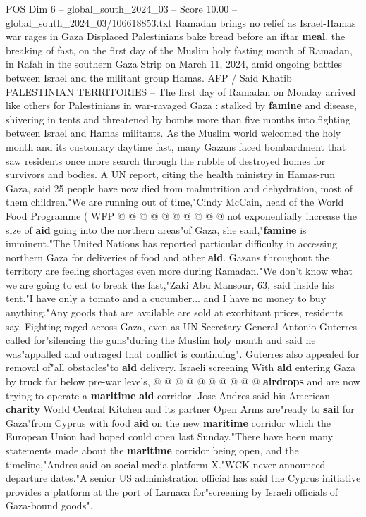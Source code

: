 \begin{textsample}{POS Dim 6 – global\_south\_2024\_03 – Score 10.00 – global\_south\_2024\_03/106618853.txt}  \label{ex:f6_pos_040}
Ramadan brings no relief as Israel-Hamas war rages in Gaza Displaced Palestinians bake bread before an iftar \textbf{meal}, the breaking of fast, on the first day of the Muslim holy fasting month of Ramadan, in Rafah in the southern Gaza Strip on March 11, 2024, amid ongoing battles between Israel and the militant group Hamas.
AFP / Said Khatib PALESTINIAN TERRITORIES -- The first day of Ramadan on Monday arrived like others for Palestinians in war-ravaged Gaza : stalked by \textbf{famine} and disease, shivering in tents and threatened by bombs more than five months into fighting between Israel and Hamas militants.
As the Muslim world welcomed the holy month and its customary daytime fast, many Gazans faced bombardment that saw residents once more search through the rubble of destroyed homes for survivors and bodies.
A UN report, citing the health ministry in Hamas-run Gaza, said 25 people have now died from malnutrition and dehydration, most of them children."We are running out of time,"Cindy McCain, head of the World Food Programme ( WFP @ @ @ @ @ @ @ @ @ @ not exponentially increase the size of \textbf{aid} going into the northern areas"of Gaza, she said,"\textbf{famine} is imminent."The United Nations has reported particular difficulty in accessing northern Gaza for deliveries of food and other \textbf{aid}.
Gazans throughout the territory are feeling shortages even more during Ramadan."We don't know what we are going to eat to break the fast,"Zaki Abu Mansour, 63, said inside his tent."I have only a tomato and a cucumber... and I have no money to buy anything."Any goods that are available are sold at exorbitant prices, residents say.
Fighting raged across Gaza, even as UN Secretary-General Antonio Guterres called for"silencing the guns"during the Muslim holy month and said he was"appalled and outraged that conflict is continuing".
Guterres also appealed for removal of"all obstacles"to \textbf{aid} delivery.
Israeli screening With \textbf{aid} entering Gaza by truck far below pre-war levels, @ @ @ @ @ @ @ @ @ @ \textbf{airdrops} and are now trying to operate a \textbf{maritime} \textbf{aid} corridor.
Jose Andres said his American \textbf{charity} World Central Kitchen and its partner Open Arms are"ready to \textbf{sail} for Gaza"from Cyprus with food \textbf{aid} on the new \textbf{maritime} corridor which the European Union had hoped could open last Sunday."There have been many statements made about the \textbf{maritime} corridor being open, and the timeline,"Andres said on social media platform X."WCK never announced departure dates."A senior US administration official has said the Cyprus initiative provides a platform at the port of Larnaca for"screening by Israeli officials of Gaza-bound goods".

\end{textsample}
